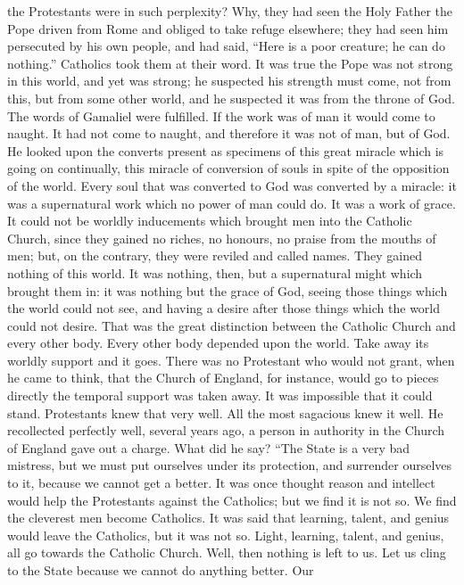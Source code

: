 the Protestants were in such perplexity? Why, they had seen the Holy
Father the Pope driven from Rome and obliged to take refuge elsewhere;
they had seen him persecuted by his own people, and had said, ``Here is
a poor creature; he can do nothing.'' Catholics took them at their
word. It was true the Pope was not strong in this world, and yet was
strong; he suspected his strength must come, not from this, but from
some other world, and he suspected it was from the throne of God. The
words of Gamaliel were fulfilled. If the work was of man it would come
to naught. It had not come to naught, and therefore it was not of man,
but of God. He looked upon the converts present as specimens of this
great miracle which is going on continually, this miracle of
conversion of souls in spite of the opposition of the world. Every
soul that was converted to God was converted by a miracle: it was a
supernatural work which no power of man could do. It was a work of
grace. It could not be worldly inducements which brought men into the
Catholic Church, since they gained no riches, no honours, no praise
from the mouths of men; but, on the contrary, they were reviled and
called names. They gained nothing of this world. It was nothing, then,
but a supernatural might which brought them in: it was nothing but the
grace of God, seeing those things which the world could not see, and
having a desire after those things which the world could not desire.
That was the great distinction between the Catholic Church and every
other body. Every other body depended upon the world. Take away its
worldly support and it goes. There was no Protestant who would not
grant, when he came to think, that the Church of England, for
instance, would go to pieces directly the temporal support was taken
away. It was impossible that it could stand. Protestants knew that
very well. All the most sagacious knew it well. He recollected
perfectly well, several years ago, a person in authority in the
Church of England gave out a charge. What did he say? ``The State is a
very bad mistress, but we must put ourselves under its protection, and
surrender ourselves to it, because we cannot get a better. It was once
thought reason and intellect would help the Protestants against the
Catholics; but we find it is not so. We find the cleverest men become
Catholics. It was said that learning, talent, and genius would leave
the Catholics, but it was not so. Light, learning, talent, and genius,
all go towards the Catholic Church. Well, then nothing is left to us.
Let us cling to the State because we cannot do anything better. Our
